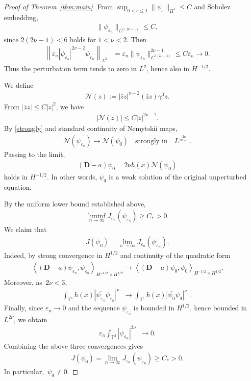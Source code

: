 \documentclass[11pt,final]{amsart}
\newcommand{\T}{\mathbb{T}}
\newcommand{\dd}{\mathop{}\!\mathrm{d}}
\newcommand{\eps}{\varepsilon}
\newcommand{\pD}{\mathbf{D}}
\DeclareMathOperator{\dv}{\dd{vol}}
\begin{document}
\begin{proof}[Proof of Theorem~\ref{thm:main}]
From $\sup_{0<\eps\le1}
\|\psi_\eps\|_{H^1}\le C$ and Sobolev embedding,
\begin{align}
\|\psi_{\eps_n}\|_{L^{2(2\nu-1)}}\le C,
\end{align}
since $2(2\nu-1)<6$ holds for $1<\nu<2$. Then
\begin{align}
\left\|
\eps_n|\psi_{\eps_n}|^{2\nu-2}
\psi_{\eps_n}
\right\|_{L^2}
&=
\eps_n
\|\psi_{\eps_n}\|_{L^{2(2\nu-1)}}^{2\nu-1}
\le
C\eps_n
\to0.
\end{align}
Thus the perturbation term tends to zero in $L^2$, hence also in $H^{-1/2}$.


We define
\begin{align}
\mathcal N(z):=|\bar z z|^{\nu-2}(\bar z z)\gamma^0z.
\end{align}
From $|\bar z z|\le C|z|^2$, we have
\begin{align}
|\mathcal N(z)|\le C|z|^{2\nu-1}.
\end{align}
By \eqref{strongly} and standard continuity of Nemytskii maps,
\begin{align}
\mathcal N(\psi_{\eps_n})
\to
\mathcal N(\psi_0)\quad\text{strongly in}\quad L^{\frac{2\nu}{2\nu-1}}.
\end{align}
Passing to the limit,
\begin{align}
(\pD-a)\psi_0=2\nu h(x)
\mathcal N(\psi_0)
\end{align}
holds in $H^{-1/2}$. In other words, $\psi_0$ is a weak solution of the original unperturbed equation.

By the uniform lower bound established above,
\begin{align}
\liminf_{n\to\infty}
J_{\eps_n}(\psi_{\eps_n})
\ge C_*>0.
\end{align}
We claim that
\begin{align}
J(\psi_0)
=\lim_{n\to\infty}
J_{\eps_n}(\psi_{\eps_n}).
\end{align}
Indeed, by strong convergence in $H^{1/2}$ and continuity of the quadratic form
\begin{align}
\left\langle
(\pD-a)\psi_{\eps_n},\psi_{\eps_n}
\right\rangle_{H^{-1/2}\times H^{1/2}}
\rightarrow
\left\langle
(\pD-a)\psi_0,\psi_0
\right\rangle_{H^{-1/2}\times H^{1/2}}.
\end{align}
Moreover, as~$2\nu<3$,
\begin{align}
\int_{\T^3}
h(x)
|\overline{\psi_{\eps_n}}
\psi_{\eps_n}|^\nu
\dv
\rightarrow
\int_{\T^3}
h(x)
|\overline{\psi_0}\psi_0|^\nu
\dv.
\end{align}
Finally, since $\eps_n\rightarrow0$ and the sequence
${\psi_{\eps_n}}$ is bounded in $H^{1/2}$, hence bounded in
$L^{2\nu}$, we obtain
\begin{align}
\eps_n
\int_{\T^3}
|\psi_{\eps_n}|^{2\nu}\dv
\rightarrow0 .
\end{align}
Combining the above three convergences gives
\begin{align}
J(\psi_0)
=\lim_{n\to\infty}
J_{\eps_n}(\psi_{\eps_n})\geq C_*>0.
\end{align}
In particular,~$\psi_0\neq 0$.


\end{proof}
\end{document}
